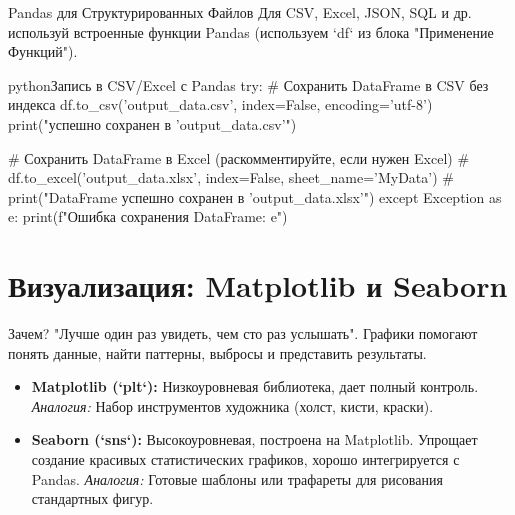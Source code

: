 \begin{myblock}{{Pandas для Структурированных Файлов}}
    Для CSV, Excel, JSON, SQL и др. используй встроенные функции Pandas (используем `df` из блока "Применение Функций").
    \begin{codebox}{python}{Запись в CSV/Excel с Pandas}
    try:
        # Сохранить DataFrame в CSV без индекса
        df.to_csv('output_data.csv', index=False, encoding='utf-8')
        print("\nDataFrame успешно сохранен в 'output_data.csv'")

        # Сохранить DataFrame в Excel (раскомментируйте, если нужен Excel)
        # df.to_excel('output_data.xlsx', index=False, sheet_name='MyData')
        # print("DataFrame успешно сохранен в 'output_data.xlsx'")
    except Exception as e:
        print(f"Ошибка сохранения DataFrame: {e}")
    \end{codebox}
\end{myblock}

\section{Визуализация: Matplotlib и Seaborn}

\begin{textbox}{Зачем?}
    "Лучше один раз увидеть, чем сто раз услышать". Графики помогают понять данные, найти паттерны, выбросы и представить результаты.
    \begin{itemize}
        \item \textbf{Matplotlib (`plt`):} Низкоуровневая библиотека, дает полный контроль. \textit{Аналогия:} Набор инструментов художника (холст, кисти, краски).
        \item \textbf{Seaborn (`sns`):} Высокоуровневая, построена на Matplotlib. Упрощает создание красивых статистических графиков, хорошо интегрируется с Pandas. \textit{Аналогия:} Готовые шаблоны или трафареты для рисования стандартных фигур.
    \end{itemize}
\end{textbox}

